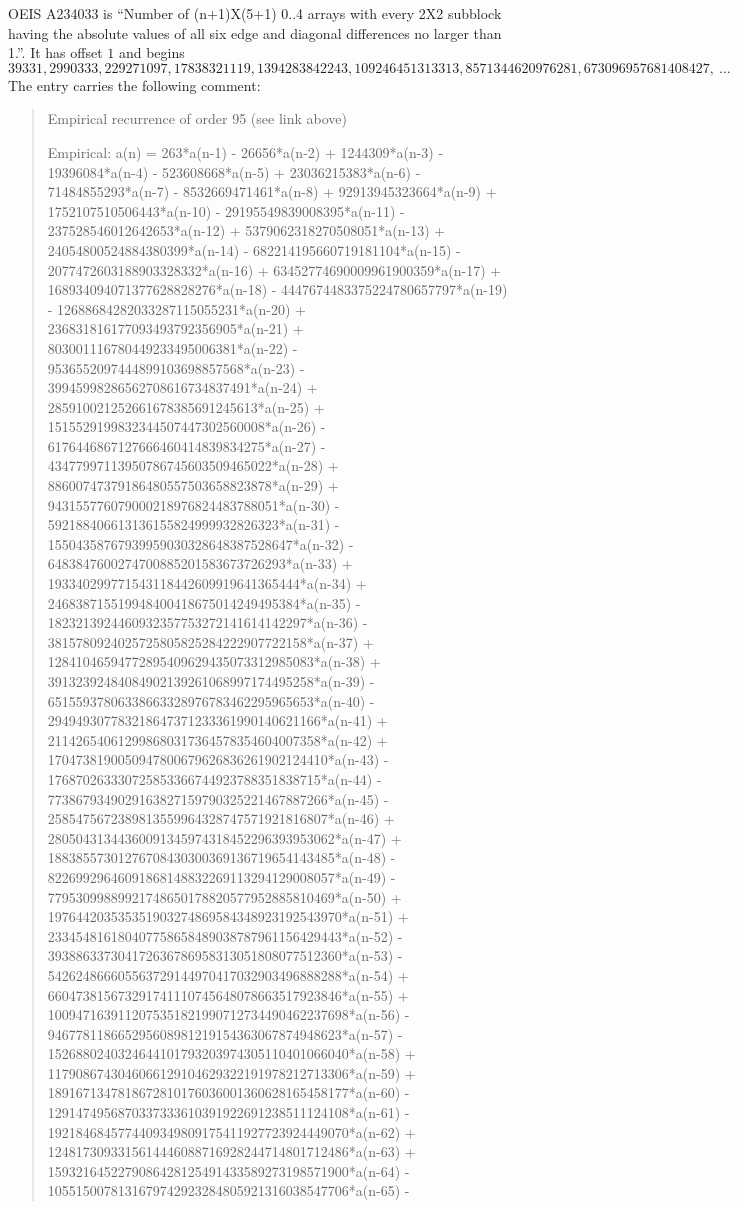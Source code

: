 \documentclass[11pt,a4paper]{article}
\theoremstyle{plain}
\theoremstyle{definition}
\begin{document}
OEIS A234033 is ``Number of (n+1)X(5+1) 0..4 arrays with every 2X2 subblock having the absolute values of all six edge and diagonal differences no larger than 1.''. It has offset $1$ and begins
\[
39331, 2990333, 229271097, 17838321119, 1394283842243, 109246451313313, 8571344620976281, 673096957681408427,\ \dots
\]
The entry carries the following comment:
\begin{quote}\small
Empirical recurrence of order 95 (see link above)

Empirical: a(n) = 263*a(n-1) - 26656*a(n-2) + 1244309*a(n-3) - 19396084*a(n-4) - 523608668*a(n-5) + 23036215383*a(n-6) - 71484855293*a(n-7) - 8532669471461*a(n-8) + 92913945323664*a(n-9) + 1752107510506443*a(n-10) - 29195549839008395*a(n-11) - 237528546012642653*a(n-12) + 5379062318270508051*a(n-13) + 24054800524884380399*a(n-14) - 682214195660719181104*a(n-15) - 2077472603188903328332*a(n-16) + 63452774690009961900359*a(n-17) + 168934094071377628828276*a(n-18) - 4447674483375224780657797*a(n-19) - 12688684282033287115055231*a(n-20) + 236831816177093493792356905*a(n-21) + 803001116780449233495006381*a(n-22) - 9536552097444899103698857568*a(n-23) - 39945998286562708616734837491*a(n-24) + 285910021252661678385691245613*a(n-25) + 1515529199832344507447302560008*a(n-26) - 6176446867127666460414839834275*a(n-27) - 43477997113950786745603509465022*a(n-28) + 88600747379186480557503658823878*a(n-29) + 943155776079000218976824483788051*a(n-30) - 592188406613136155824999932826323*a(n-31) - 15504358767939959030328648387528647*a(n-32) - 6483847600274700885201583673726293*a(n-33) + 193340299771543118442609919641365444*a(n-34) + 246838715519948400418675014249495384*a(n-35) - 1823213924460932357753272141614142297*a(n-36) - 3815780924025725805825284222907722158*a(n-37) + 12841046594772895409629435073312985083*a(n-38) + 39132392484084902139261068997174495258*a(n-39) - 65155937806338663328976783462295965653*a(n-40) - 294949307783218647371233361990140621166*a(n-41) + 211426540612998680317364578354604007358*a(n-42) + 1704738190050947800679626836261902124410*a(n-43) - 176870263330725853366744923788351838715*a(n-44) - 7738679349029163827159790325221467887266*a(n-45) - 2585475672389813559964328747571921816807*a(n-46) + 28050431344360091345974318452296393953062*a(n-47) + 18838557301276708430300369136719654143485*a(n-48) - 82269929646091868148832269113294129008057*a(n-49) - 77953099889921748650178820577952885810469*a(n-50) + 197644203535351903274869584348923192543970*a(n-51) + 233454816180407758658489038787961156429443*a(n-52) - 393886337304172636786958313051808077512360*a(n-53) - 542624866605563729144970417032903496888288*a(n-54) + 660473815673291741110745648078663517923846*a(n-55) + 1009471639112075351821990712734490462237698*a(n-56) - 946778118665295608981219154363067874948623*a(n-57) - 1526880240324644101793203974305110401066040*a(n-58) + 1179086743046066129104629322191978212713306*a(n-59) + 1891671347818672810176036001360628165458177*a(n-60) - 1291474956870337333610391922691238511124108*a(n-61) - 1921846845774409349809175411927723924449070*a(n-62) + 1248173093315614446088716928244714801712486*a(n-63) + 1593216452279086428125491433589273198571900*a(n-64) - 1055150078131679742923284805921316038547706*a(n-65) - 
\end{quote}
\end{document}
